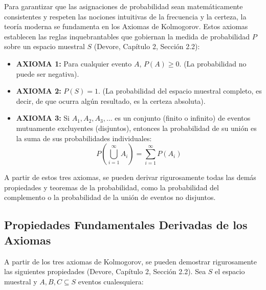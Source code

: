 Para garantizar que las asignaciones de probabilidad sean matemáticamente consistentes y respeten las nociones intuitivas de la frecuencia y la certeza, la teoría moderna se fundamenta en los Axiomas de Kolmogorov. Estos axiomas establecen las reglas inquebrantables que gobiernan la medida de probabilidad $P$ sobre un espacio muestral $S$ (Devore, Capítulo 2, Sección 2.2):

\begin{itemize}
    \item \textbf{AXIOMA 1:} Para cualquier evento $A$, $P(A) \ge 0$. (La probabilidad no puede ser negativa).
    \item \textbf{AXIOMA 2:} $P(S) = 1$. (La probabilidad del espacio muestral completo, es decir, de que ocurra algún resultado, es la certeza absoluta).
    \item \textbf{AXIOMA 3:} Si $A_1, A_2, A_3, \dots$ es un conjunto (finito o infinito) de eventos mutuamente excluyentes (disjuntos), entonces la probabilidad de su unión es la suma de sus probabilidades individuales:
    $$ P\left(\bigcup_{i=1}^{\infty} A_i\right) = \sum_{i=1}^{\infty} P(A_i) $$
\end{itemize}

A partir de estos tres axiomas, se pueden derivar rigurosamente todas las demás propiedades y teoremas de la probabilidad, como la probabilidad del complemento o la probabilidad de la unión de eventos no disjuntos.

\subsection{Propiedades Fundamentales Derivadas de los Axiomas}

A partir de los tres axiomas de Kolmogorov, se pueden demostrar rigurosamente las siguientes propiedades (Devore, Capítulo 2, Sección 2.2). Sea $S$ el espacio muestral y $A, B, C \subseteq S$ eventos cualesquiera:

